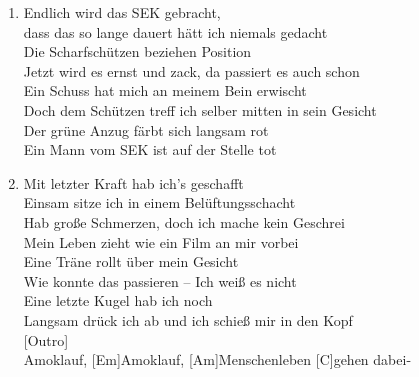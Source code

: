 \begin{guitarMagic}
\begin{enumerate}
            \liedweiter
            \liedweiter
        \item Endlich wird das SEK gebracht,\\
            dass das so lange dauert hätt ich niemals gedacht\\
            Die Scharfschützen beziehen Position\\
            Jetzt wird es ernst und zack, da passiert es auch schon\\
            Ein Schuss hat mich an meinem Bein erwischt\\
            Doch dem Schützen treff ich selber mitten in sein Gesicht\\
            Der grüne Anzug färbt sich langsam rot\\
            Ein Mann vom SEK ist auf der Stelle tot\\

        \item Mit letzter Kraft hab ich's geschafft\\
            Einsam sitze ich in einem Belüftungsschacht\\
            Hab große Schmerzen, doch ich mache kein Geschrei\\
            Mein Leben zieht wie ein Film an mir vorbei\\
            Eine Träne rollt über mein Gesicht\\
            Wie konnte das passieren – Ich weiß es nicht\\
            Eine letzte Kugel hab ich noch\\
            Langsam drück ich ab und ich schieß mir in den Kopf\\


            [Outro]\\
            [G]Amoklauf, [Em]Amoklauf, [Am]Menschenleben [C]gehen dabei-
    \end{enumerate}
\end{guitarMagic}
